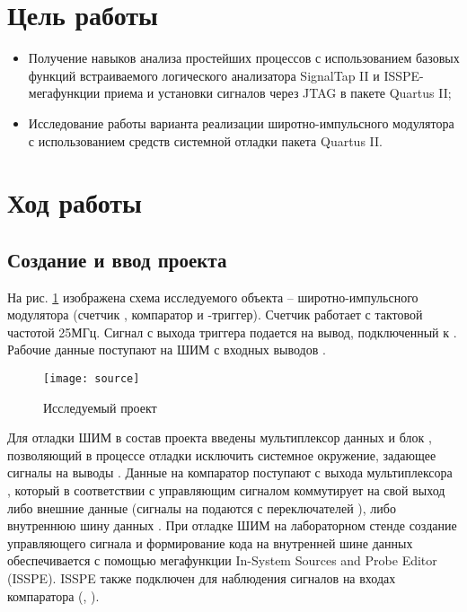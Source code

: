 





\tableofcontents
\newpage

\section{Цель работы}

\begin{itemize}
	\item Получение навыков анализа простейших процессов с использованием базовых функций встраиваемого логического анализатора SignalTap II и ISSPE-мегафункции приема и установки сигналов через JTAG в пакете Quartus II;
	\item Исследование работы варианта реализации широтно-импульсного модулятора с использованием средств системной отладки пакета Quartus II.
\end{itemize}

\section{Ход работы}

\subsection{Создание и ввод проекта}

На рис. \ref{fig:source} изображена схема исследуемого объекта -- широтно-импульсного модулятора (счетчик , компаратор  и -триггер). Счетчик работает с тактовой частотой 25МГц. Сигнал с выхода триггера подается на вывод, подключенный к . Рабочие данные поступают на ШИМ с входных выводов .

\vspace{-0.5cm}
\begin{figure}[H]
	\begin{center}
		\texttt{[image: source]}
		\caption{Исследуемый проект}
		\label{fig:source}
	\end{center}
\end{figure}
\vspace{-0.5cm}

Для отладки ШИМ в состав проекта введены мультиплексор данных  и блок , позволяющий в процессе отладки исключить системное окружение, задающее сигналы на выводы . Данные на компаратор поступают с выхода мультиплексора , который в соответствии с управляющим сигналом  коммутирует на свой выход либо внешние данные  (сигналы на  подаются с переключателей ), либо внутреннюю шину данных . При отладке ШИМ на лабораторном стенде создание управляющего сигнала  и формирование кода на внутренней шине данных  обеспечивается с помощью мегафункции In-System Sources and Probe Editor (ISSPE). ISSPE также подключен для наблюдения сигналов на входах компаратора (, ).

